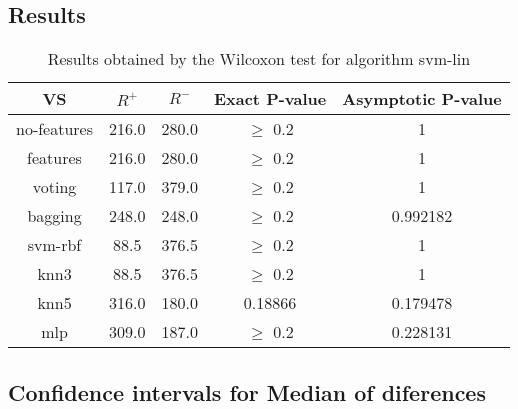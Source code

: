 \documentclass[a4paper,10pt]{article}
\begin{document}
\subsection{Results}

\begin{table}[!htp]
\centering\small
\begin{tabular}{
|c|c|c|c|c|}
\hline
 VS & $R^{+}$ & $R^{-}$ & Exact P-value & Asymptotic P-value \\ \hline 
no-features & 216.0 & 280.0 & $\geq$ 0.2 & 1\\ \hline 
features & 216.0 & 280.0 & $\geq$ 0.2 & 1\\ \hline 
voting & 117.0 & 379.0 & $\geq$ 0.2 & 1\\ \hline 
bagging & 248.0 & 248.0 & $\geq$ 0.2 & 0.992182\\ \hline 
svm-rbf & 88.5 & 376.5 & $\geq$ 0.2 & 1\\ \hline 
knn3 & 88.5 & 376.5 & $\geq$ 0.2 & 1\\ \hline 
knn5 & 316.0 & 180.0 & 0.18866 & 0.179478\\ \hline 
mlp & 309.0 & 187.0 & $\geq$ 0.2 & 0.228131\\ \hline 

\end{tabular}
\caption{Results obtained by the Wilcoxon test for algorithm svm-lin}
\end{table}

\subsection{Confidence intervals for Median of diferences}
\end{document}
